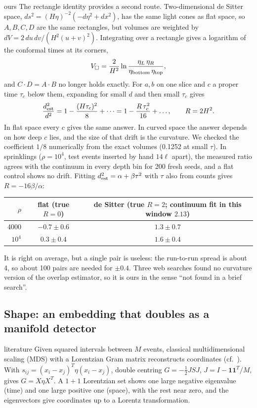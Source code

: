 \documentclass[11pt,a4paper]{article}
\newcommand{\tagbox}[2]{\textsf{\scriptsize\colorbox{#1!12}{\textcolor{#1!70!black}{#2}}}}
\newcommand{\lit}{\tagbox{blue}{literature}}
\newcommand{\ours}{\tagbox{orange}{ours}}
\begin{document}
\ours{} The rectangle identity provides a second route. Two-dimensional de Sitter space, $ds^2=(H\eta)^{-2}(-d\eta^2+dx^2)$, has the same light cones as flat space, so $A,B,C,D$ are the same rectangles, but volumes are weighted by $dV=2\,du\,dv/(H^2(u+v)^2)$. Integrating over a rectangle gives a logarithm of the conformal times at its corners,
\begin{equation}
V_\square=\frac{2}{H^2}\ln\frac{\eta_L\,\eta_R}{\eta_{\rm bottom}\,\eta_{\rm top}},
\end{equation}
and $C\cdot D=A\cdot B$ no longer holds exactly. For $a,b$ on one slice and $c$ a proper time $\tau_c$ below them, expanding for small $d$ and then small $\tau_c$ gives
\begin{equation}
\frac{d_{\rm est}^2}{d^2}=1-\frac{(H\tau_c)^2}{8}+\dots=1-\frac{R\,\tau_c^2}{16}+\dots,\qquad R=2H^2 .
\label{eq:drift}
\end{equation}
In flat space every $c$ gives the same answer. In curved space the answer depends on how deep $c$ lies, and the size of that drift is the curvature. We checked the coefficient $1/8$ numerically from the exact volumes (0.1252 at small $\tau$). In sprinklings ($\rho=10^4$, test events inserted by hand $14\ell$ apart), the measured ratio agrees with the continuum in every depth bin for 200 fresh seeds, and a flat control shows no drift. Fitting $d_{\rm est}^2=\alpha+\beta\tau^2$ with $\tau$ also from counts gives $R=-16\beta/\alpha$:
\begin{center}\small
\begin{tabular}{@{}rcc@{}}
\toprule
$\rho$ & flat (true $R=0$) & de Sitter (true $R=2$; continuum fit in this window $2.13$)\\
\midrule
4000 & $-0.7\pm0.6$ & $1.3\pm0.7$\\
$10^4$ & $0.3\pm0.4$ & $1.6\pm0.4$\\
\bottomrule
\end{tabular}
\end{center}
It is right on average, but a single pair is useless: the run-to-run spread is about 4, so about 100 pairs are needed for $\pm0.4$. Three web searches found no curvature version of the overlap estimator, so it is \ours{} in the sense ``not found in a brief search''.

\subsection{Shape: an embedding that doubles as a manifold detector}
\lit{} Given squared intervals between $M$ events, classical multidimensional scaling (MDS) with a Lorentzian Gram matrix reconstructs coordinates (cf.~\cite{Johnston25}). With $s_{ij}=(x_i-x_j)^T\eta(x_i-x_j)$, double centring $G=-\tfrac12JSJ$, $J=I-\mathbf 1\mathbf 1^T/M$, gives $G=X\eta X^T$. A $1+1$ Lorentzian set shows one large negative eigenvalue (time) and one large positive one (space), with the rest near zero, and the eigenvectors give coordinates up to a Lorentz transformation.
\end{document}
